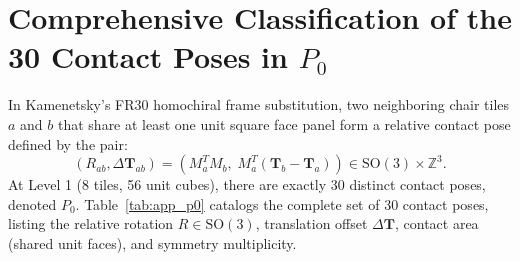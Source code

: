 \documentclass[11pt,a4paper]{article}
\theoremstyle{definition}
\newcommand{\Z}{\mathbb{Z}}
\newcommand{\SO}{\mathrm{SO}}
\begin{document}
\appendix

\section{Comprehensive Classification of the 30 Contact Poses in $P_0$}
\label{app:p0_contacts}

In Kamenetsky's FR30 homochiral frame substitution, two neighboring chair tiles $a$ and $b$ that share at least one unit square face panel form a relative contact pose defined by the pair:
\begin{equation}
(R_{ab}, \Delta\mathbf{T}_{ab}) = \left( M_a^T M_b, \; M_a^T (\mathbf{T}_b - \mathbf{T}_a) \right) \in \SO(3) \times \Z^3.
\end{equation}
At Level 1 (8 tiles, 56 unit cubes), there are exactly 30 distinct contact poses, denoted $P_0$. 
Table~\ref{tab:app_p0} catalogs the complete set of 30 contact poses, listing the relative rotation $R \in \SO(3)$, translation offset $\Delta\mathbf{T}$, contact area (shared unit faces), and symmetry multiplicity.
\end{document}
